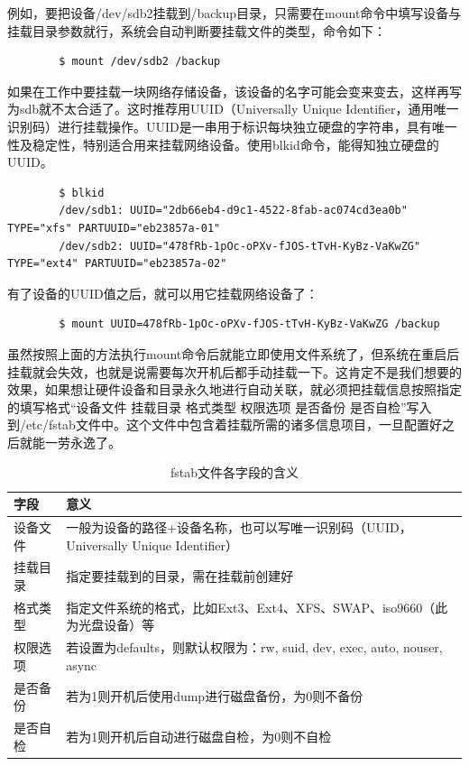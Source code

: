 \documentclass[UTF8]{article}
\begin{document}
	
	例如，要把设备/dev/sdb2挂载到/backup目录，只需要在mount命令中填写设备与挂载目录参数就行，系统会自动判断要挂载文件的类型，命令如下：
	
	\begin{lstlisting}
		$ mount /dev/sdb2 /backup
	\end{lstlisting}
	
	如果在工作中要挂载一块网络存储设备，该设备的名字可能会变来变去，这样再写为sdb就不太合适了。这时推荐用UUID（Universally Unique Identifier，通用唯一识别码）进行挂载操作。UUID是一串用于标识每块独立硬盘的字符串，具有唯一性及稳定性，特别适合用来挂载网络设备。使用blkid命令，能得知独立硬盘的UUID。
	
	\begin{lstlisting}
		$ blkid
		/dev/sdb1: UUID="2db66eb4-d9c1-4522-8fab-ac074cd3ea0b" TYPE="xfs" PARTUUID="eb23857a-01"
		/dev/sdb2: UUID="478fRb-1pOc-oPXv-fJOS-tTvH-KyBz-VaKwZG" TYPE="ext4" PARTUUID="eb23857a-02"
	\end{lstlisting}
	
	有了设备的UUID值之后，就可以用它挂载网络设备了：
	
	\begin{lstlisting}
		$ mount UUID=478fRb-1pOc-oPXv-fJOS-tTvH-KyBz-VaKwZG /backup
	\end{lstlisting}
	
	
	虽然按照上面的方法执行mount命令后就能立即使用文件系统了，但系统在重启后挂载就会失效，也就是说需要每次开机后都手动挂载一下。这肯定不是我们想要的效果，如果想让硬件设备和目录永久地进行自动关联，就必须把挂载信息按照指定的填写格式“设备文件 挂载目录 格式类型 权限选项 是否备份 是否自检”写入到/etc/fstab文件中。这个文件中包含着挂载所需的诸多信息项目，一旦配置好之后就能一劳永逸了。
	
	\begin{table}
		\centering
		\caption{fstab文件各字段的含义}
		\begin{tabular}{ll}
			\hline
			字段 & 意义 \\
			\hline
			设备文件 & 一般为设备的路径+设备名称，也可以写唯一识别码（UUID，Universally Unique Identifier） \\
			挂载目录 & 指定要挂载到的目录，需在挂载前创建好 \\
			格式类型 & 指定文件系统的格式，比如Ext3、Ext4、XFS、SWAP、iso9660（此为光盘设备）等 \\
			权限选项 & 若设置为defaults，则默认权限为：rw, suid, dev, exec, auto, nouser, async \\
			是否备份 & 若为1则开机后使用dump进行磁盘备份，为0则不备份 \\
			是否自检 & 若为1则开机后自动进行磁盘自检，为0则不自检 \\
			\hline
		\end{tabular}
	\end{table}
	
\end{document}
